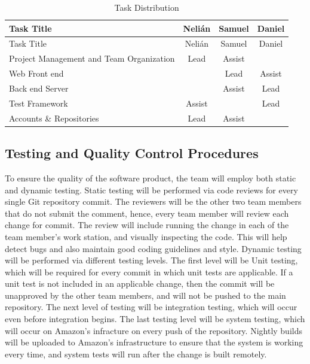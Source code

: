 \begin{center}
\setlength{\extrarowheight}{1.5pt}
  \begin{longtable}{|m{3.25in}|c|c|c|}
 \caption{Task Distribution \label{tasks}} \\
   \hline
  
  \centering Task Title & Nelián & Samuel & Daniel \\
  \hline \hline \endfirsthead
  
     \hline

	\centering Task Title & Nelián & Samuel & Daniel \\  
	\hline \hline \endhead
  
  \endfoot  
  
  Project Management and Team Organization & Lead & Assist & \\ \hline
  Web Front end & & Lead & Assist \\ \hline
  Back end Server & & Assist & Lead \\ \hline
  Test Framework & Assist & & Lead \\ \hline
  Accounts \& Repositories & Lead & Assist & \\ \hline
   \end{longtable}
\end{center}

\subsection{Testing and Quality Control Procedures}

To ensure the quality of the software product, the team will employ both static
and dynamic testing. Static testing will be performed via code reviews for every
single Git repository commit. The reviewers will be the other two team members
that do not submit the comment, hence, every team member will review each change
for commit. The review will include running the change in each of the team
member's work station, and visually inspecting the code. This will help detect
bugs and also maintain good coding guidelines and style. Dynamic testing will be
performed via different testing levels. The first level will be Unit testing,
which will be required for every commit in which unit tests are applicable. If a
unit test is not included in an applicable change, then the commit will be
unapproved by the other team members, and will not be pushed to the main
repository. The next level of testing will be integration testing, which will
occur even before integration begins. The last testing level will be system
testing, which will occur on Amazon's infracture on every push of the
repository. Nightly builds will be uploaded to Amazon's infrastructure to ensure
that the system is working every time, and system tests will run after the
change is built remotely.
